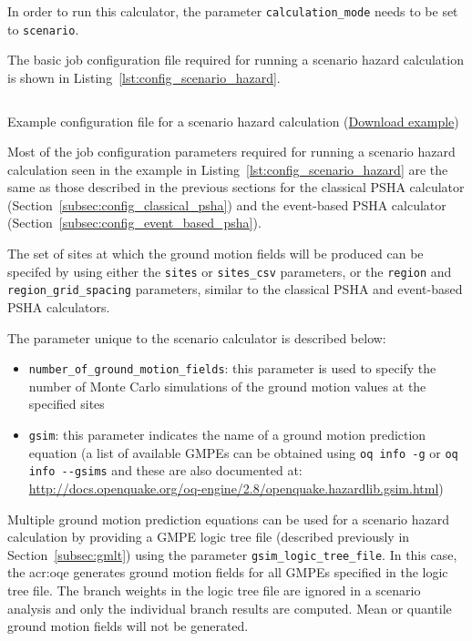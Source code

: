 In order to run this calculator, the parameter \Verb+calculation_mode+ needs
to be set to \Verb+scenario+. 

The basic job configuration file required for running a scenario hazard
calculation is shown in Listing~\ref{lst:config_scenario_hazard}.

\begin{listing}[htbp]
  \inputminted[firstline=1,firstnumber=1,fontsize=\footnotesize,frame=single,linenos,bgcolor=lightgray,label=job.ini]{ini}{oqum/hazard/verbatim/config_scenario.ini}
  \caption{Example configuration file for a scenario hazard calculation (\href{https://raw.githubusercontent.com/gem/oq-engine/master/oqum/hazard/verbatim/config_scenario.ini}{Download example})}
  \label{lst:config_scenario_hazard}
\end{listing}

Most of the job configuration parameters required for running a scenario
hazard calculation seen in the example in
Listing~\ref{lst:config_scenario_hazard} are the same as those described in
the previous sections for the classical PSHA calculator
(Section~\ref{subsec:config_classical_psha}) and the event-based PSHA
calculator (Section~\ref{subsec:config_event_based_psha}).

The set of sites at which the ground motion fields will be produced can be
specifed by using either the \Verb+sites+ or \Verb+sites_csv+ parameters, or
the \Verb+region+ and \Verb+region_grid_spacing+  parameters, similar to the
classical PSHA and event-based PSHA calculators.

The parameter unique to the scenario calculator is described below:

\begin{itemize}

  \item \Verb+number_of_ground_motion_fields+: this parameter is used to
    specify the number of Monte Carlo simulations of the ground motion
    values at the specified sites

  \item \Verb+gsim+: this parameter indicates the name of a ground motion
  prediction equation (a list of available GMPEs can be obtained using
  \texttt{oq info -g} or \texttt{oq info -{}-gsims} and these are also
  documented at: \href{http://docs.openquake.org/oq-engine/2.8/openquake.hazardlib.gsim.html}{http://docs.openquake.org/oq-engine/2.8/openquake.hazardlib.gsim.html})

\end{itemize}

Multiple ground motion prediction equations can be used for a scenario hazard
calculation by providing a GMPE logic tree file (described previously in 
Section~\ref{subsec:gmlt}) using the parameter \Verb+gsim_logic_tree_file+.
In this case, the \glsdesc{acr:oqe} generates ground motion fields
for all GMPEs specified in the logic tree file. The branch weights in the logic
tree file are ignored in a scenario analysis and only the individual branch
results are computed. Mean or quantile ground motion fields will not be 
generated.